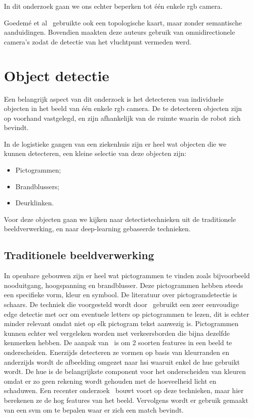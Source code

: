         In dit onderzoek gaan we ons echter beperken tot \'{e}\'{e}n enkele \gls{rgb} camera.

        Goedem\'{e} et al~\cite{goedeme2007omnidirectional} gebruikte ook een topologische kaart, maar zonder semantische aanduidingen.
        Bovendien maakten deze auteurs gebruik van omnidirectionele camera's zodat de detectie van het vluchtpunt vermeden werd.
        
        
    \section{Object detectie}\label{sec:object_det}

        Een belangrijk aspect van dit onderzoek is het detecteren van individuele objecten in het beeld van \'{e}\'{e}n enkele \gls{rgb} camera.
        De te detecteren objecten zijn op voorhand vastgelegd, en zijn afhankelijk van de ruimte waarin de robot zich bevindt.

        In de logistieke gangen van een ziekenhuis zijn er heel wat objecten die we kunnen detecteren, een kleine selectie van deze objecten zijn:

        \begin{itemize}
            \item Pictogrammen;
            \item Brandblussers;
            \item Deurklinken.
        \end{itemize}

        Voor deze objecten gaan we kijken naar detectietechnieken uit de traditionele beeldverwerking, en naar deep-learning gebaseerde technieken.


        \subsection{Traditionele beeldverwerking} \label{sec:trad_obj_det}
            In openbare gebouwen zijn er heel wat pictogrammen te vinden zoals bijvoorbeeld nooduitgang, hoogspanning en brandblusser. Deze pictogrammen hebben steeds een specifieke vorm, kleur en symbool.
            De literatuur over pictogramdetectie is schaars. De techniek die voorgesteld wordt door~\cite{swathika2016} gebruikt een zeer eenvoudige edge detectie met \gls{ocr} om eventuele letters op pictogrammen te lezen, dit is echter minder relevant omdat niet op elk pictogram tekst aanwezig is. Pictogrammen kunnen echter wel vergeleken worden met verkeersborden die bijna dezelfde kenmerken hebben.
            De aanpak van~\cite{Fang2003} is om 2 soorten features in een beeld te onderscheiden. Enerzijds detecteren ze vormen op basis van kleurranden en anderzijds wordt de
            afbeelding omgezet naar \gls{hsi} waaruit enkel de hue gebruikt wordt. De hue is de belangrijkste component voor het onderscheiden van kleuren omdat er zo geen rekening wordt gehouden
            met de hoeveelheid licht en schaduwen.
            Een recenter onderzoek~\cite{Zabihi2017} bouwt voort op deze technieken, maar hier berekenen ze de \gls{hog} features van het beeld.
            Vervolgens wordt er gebruik gemaakt van een \gls{svm} om te bepalen waar er zich een match bevindt.

